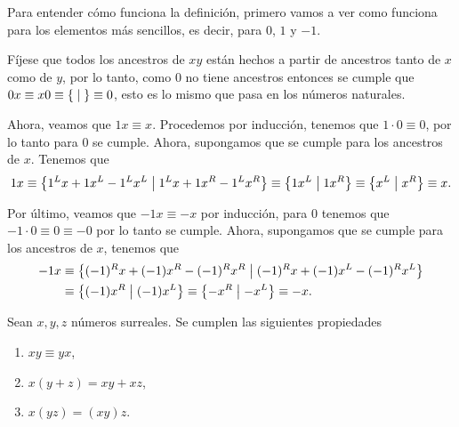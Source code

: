     \begin{example}
        Para entender c\'omo funciona la definici\'on, primero vamos a ver como funciona para los elementos m\'as sencillos, es decir, para $0$, $1$ y $-1$.

        F\'ijese que todos los ancestros de $xy$ est\'an hechos a partir de ancestros tanto de $x$ como de $y$, por lo tanto, como $0$ no tiene ancestros entonces se cumple que $0x \equiv x0 \equiv \left\{\;\middle|\; \right\} \equiv 0$, esto es lo mismo que pasa en los n\'umeros naturales.
        
        Ahora, veamos que $1x \equiv x$. Procedemos por inducci\'on, tenemos que $1\cdot 0 \equiv 0$, por lo tanto para $0$ se cumple. Ahora, supongamos que se cumple para los ancestros de $x$. Tenemos que 
        \[
            1x \equiv \left\{1^Lx + 1x^L - 1^Lx^L\;\middle|\; 1^Lx + 1x^R - 1^Lx^R\right\} \equiv \left\{1x^L\;\middle|\; 1x^R\right\} \equiv \left\{x^L\;\middle|\; x^R\right\} \equiv x.
        \]

        Por \'ultimo, veamos que $-1x \equiv -x$ por inducci\'on, para $0$ tenemos que $-1\cdot 0\equiv 0 \equiv -0$ por lo tanto se cumple. Ahora, supongamos que se cumple para los ancestros de $x$, tenemos que 
        \begin{align*}
            -1x & \equiv \left\{(-1)^Rx + (-1)x^R - (-1)^Rx^R\;\middle|\; (-1)^Rx + (-1)x^L - (-1)^Rx^L\right\} \\
             & \equiv \left\{(-1)x^R\;\middle|\; (-1)x^L\right\} \equiv \left\{-x^R\;\middle|\; -x^L\right\} \equiv -x.
        \end{align*}
    \end{example}

    \begin{theorem}
        Sean $x,y,z$ n\'umeros surreales. Se cumplen las siguientes propiedades
        \begin{enumerate}[nosep]
            \item $xy\equiv yx$,
            \item $x(y+z) = xy + xz$,
            \item $x(yz) = (xy)z$.
        \end{enumerate}
    \end{theorem}

